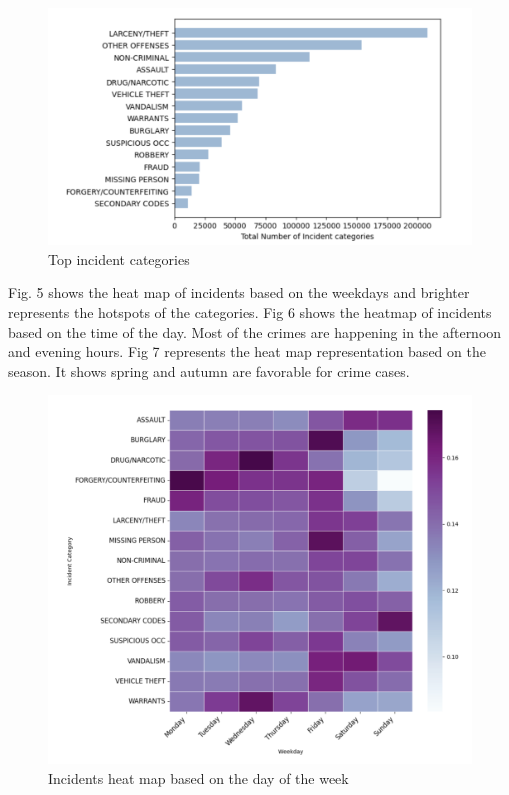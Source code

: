 \documentclass[11 pt,conference,final,]{IEEEtran}
\begin{document}
\begin{figure}

{\centering \includegraphics[width=0.95\linewidth]{img/fig4} 

}

\caption{Top incident categories}\label{fig:unnamed-chunk-4}
\end{figure}

Fig. 5 shows the heat map of incidents based on the weekdays and
brighter represents the hotspots of the categories. Fig 6 shows the
heatmap of incidents based on the time of the day. Most of the crimes
are happening in the afternoon and evening hours. Fig 7 represents the
heat map representation based on the season. It shows spring and autumn
are favorable for crime cases.

\begin{figure}

{\centering \includegraphics[width=0.9\linewidth]{img/fig5} 

}

\caption{Incidents heat map based on the day of the week}\label{fig:unnamed-chunk-5}
\end{figure}
\end{document}
